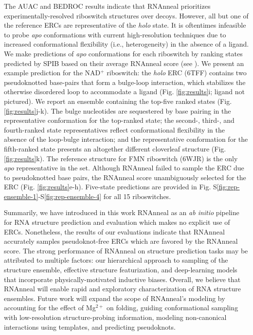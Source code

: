 \documentclass[%
aip,
 amsmath,amssymb,
reprint,%
onecolumn,
]{revtex4-1}
\begin{document}
{The AUAC and BEDROC results indicate that RNAnneal prioritizes experimentally-resolved riboswitch structures over decoys. However, all but one of the reference ERCs are representative of the {\it holo} state. It is oftentimes infeasible to probe {\it apo} conformations with current high-resolution techniques due to increased conformational flexibility (i.e., heterogeneity) in the absence of a ligand. We make predictions of {\it apo} conformations for each riboswitch by ranking states predicted by SPIB based on their average RNAnneal score (see ). We present an example prediction for the NAD$^{+}$ riboswitch: the {\it holo} ERC (6TFF) contains two pseudoknotted base-pairs that form a bulge-loop interaction, which stabilizes the otherwise disordered loop to accommodate a ligand (Fig. \ref{fig:results}i; ligand not pictured). We report an ensemble containing the top-five ranked states (Fig. \ref{fig:results}j-k). The bulge nucleotides are sequestered by base pairing in the representative conformation for the top-ranked state; the second-, third-, and fourth-ranked state representatives reflect conformational flexibility in the absence of the loop-bulge interaction; and the representative conformation for the fifth-ranked state presents an altogether different cloverleaf structure (Fig. \ref{fig:results}k). The reference structure for FMN riboswitch (6WJR) is the only {\it apo} representative in the set. Although RNAnneal failed to sample the ERC due to pseudoknotted base pairs, the RNAnneal score unambiguously selected for the ERC (Fig. \ref{fig:results}e-h). Five-state predictions are provided in Fig. S\ref{fig:rep-ensemble-1}-S\ref{fig:rep-ensemble-4} for all 15 riboswitches. 

Summarily, we have introduced in this work RNAnneal as an {\it ab initio} pipeline for RNA structure prediction and evaluation which makes no explicit use of ERCs. Nonetheless, the results of our evaluations indicate that RNAnneal accurately samples pseudoknot-free ERCs which are favored by the RNAnneal score. The strong performance of RNAnneal on structure prediction tasks may be attributed to multiple factors: our hierarchical approach to sampling of the structure ensemble, effective structure featurization, and deep-learning models that incorporate physically-motivated inductive biases. Overall, we believe that RNAnneal will enable rapid and exploratory characterization of RNA structure ensembles. Future work will expand the scope of RNAnneal's modeling by accounting for the effect of Mg$^\mathrm{2+}$ on folding, guiding conformational sampling with low-resolution structure-probing information, modeling non-canonical interactions using templates, and predicting pseudoknots.

}
\end{document}
